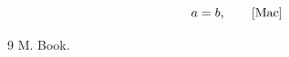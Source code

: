 \documentclass{article}
\begin{document}
$$ a = b, \qquad \cite[\text{I}.2.11^\prime]{Mac} $$
\begin{thebibliography}{9} M. Book.\end{thebibliography}
\end{document}

